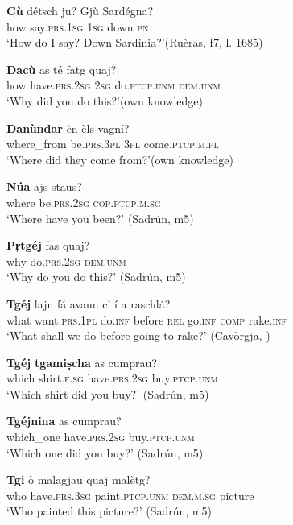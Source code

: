 \ea
\label{ex:int8}
\gll \textbf{Cù} détsch ju? Gjù Sardégna?\\
how say.\textsc{prs.1sg} \textsc{1sg} down \textsc{pn}\\
\glt `How do I say? Down Sardinia?'(Ruèras, f7, l. 1685)
\z

\ea
\label{ex:int10}
\gll \textbf{Dacù} as té fatg quaj?\\
how have.\textsc{prs.2sg} \textsc{2sg} do.\textsc{ptcp.unm} \textsc{dem.unm}\\
\glt `Why did you do this?'(own knowledge)
\z

\ea
\label{ex:int11}
\gll \textbf{Danùndar} èn èls vagní?\\
where\_from be.\textsc{prs.3pl} \textsc{3pl} come.\textsc{ptcp.m.pl}\\
\glt `Where did they come from?'(own knowledge)
\z

\ea
\label{ex:int3}
\gll \textbf{Núa} ajs staus?\\
where be.\textsc{prs.2sg} \textsc{cop.ptcp.m.sg}\\
\glt `Where have you been?' (Sadrún, m5)
\z

\ea
\label{ex:int5}
\gll \textbf{Pr̩tgéj} fas quaj?\\
why do.\textsc{prs.2sg} \textsc{dem.unm}\\
\glt `Why do you do this?' (Sadrún, m5)
\z

\ea
\label{ex:int2}
\gll \textbf{Tgéj} lajn fá avaun c' í a raschlá?\\
what want.\textsc{prs.1pl} do.\textsc{inf} before \textsc{rel} go.\textsc{inf} \textsc{comp} rake.\textsc{inf}\\
\glt `What shall we do before going to rake?' (Cavòrgja, \citealt[121]{Büchli1966})
\z

\ea
\label{ex:int6}
\gll \textbf{Tgéj} \textbf{tgamiṣcha} as cumprau?\\
which shirt.\textsc{f.sg} have.\textsc{prs.2sg} buy.\textsc{ptcp.unm}\\
\glt `Which shirt did you buy?' (Sadrún, m5)
\z

\ea
\label{ex:int7}
\gll \textbf{Tgéjnina} as cumprau?\\
which\_one have.\textsc{prs.2sg} buy.\textsc{ptcp.unm}\\
\glt `Which one did you buy?' (Sadrún, m5)
\z

\ea
\label{ex:int1}
\gll \textbf{Tgi} ò malagjau quaj malètg?\\
who have.\textsc{prs.3sg} paint.\textsc{ptcp.unm} \textsc{dem.m.sg} picture\\
\glt `Who painted this picture?' (Sadrún, m5)
\z

